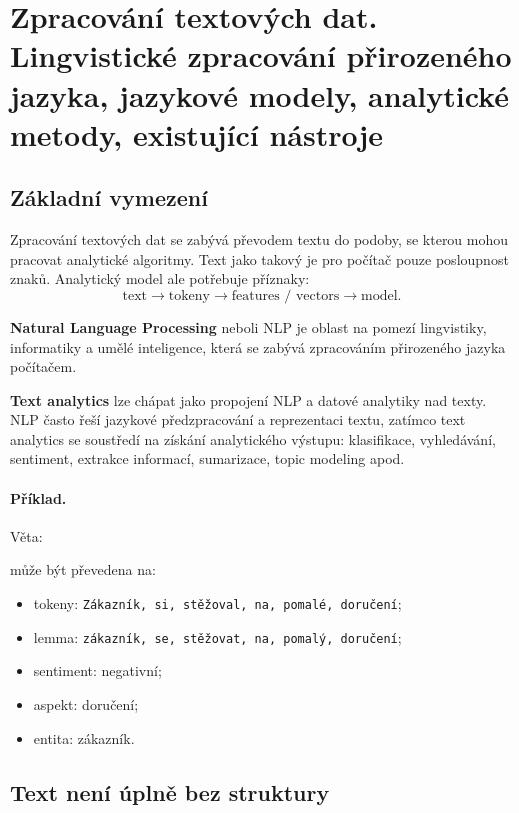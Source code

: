 \section{Zpracování textových dat. Lingvistické zpracování přirozeného jazyka, jazykové modely, analytické metody, existující nástroje}

\subsection{Základní vymezení}

Zpracování textových dat se zabývá převodem textu do podoby, se kterou mohou pracovat analytické algoritmy.
Text jako takový je pro počítač pouze posloupnost znaků. Analytický model ale potřebuje příznaky:
\[
\text{text}
\rightarrow
\text{tokeny}
\rightarrow
\text{features / vectors}
\rightarrow
\text{model}.
\]

\textbf{Natural Language Processing} neboli NLP je oblast na pomezí lingvistiky, informatiky a umělé
inteligence, která se zabývá zpracováním přirozeného jazyka počítačem.

\textbf{Text analytics} lze chápat jako propojení NLP a datové analytiky nad texty. NLP často řeší jazykové
předzpracování a reprezentaci textu, zatímco text analytics se soustředí na získání analytického výstupu:
klasifikace, vyhledávání, sentiment, extrakce informací, sumarizace, topic modeling apod.

\paragraph{Příklad.}
Věta:
\begin{quote}
\end{quote}
může být převedena na:
\begin{itemize}
    \item tokeny: \texttt{Zákazník, si, stěžoval, na, pomalé, doručení};
    \item lemma: \texttt{zákazník, se, stěžovat, na, pomalý, doručení};
    \item sentiment: negativní;
    \item aspekt: doručení;
    \item entita: zákazník.
\end{itemize}

\subsection{Text není úplně bez struktury}

